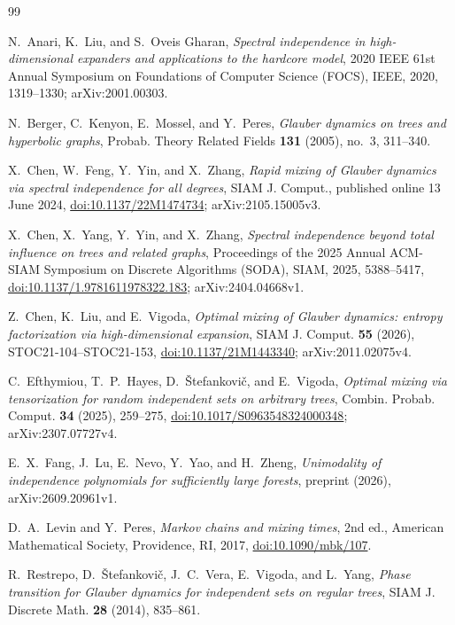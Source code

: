 \documentclass{amsart}
\numberwithin{equation}{section}
\numberwithin{table}{section}
\theoremstyle{definition}
\theoremstyle{remark}
\begin{document}
\begin{thebibliography}{99}

N.~Anari, K.~Liu, and S.~Oveis Gharan, \emph{Spectral independence in high-dimensional expanders and applications to the hardcore model}, 2020 IEEE 61st Annual Symposium on Foundations of Computer Science (FOCS), IEEE, 2020, 1319--1330; arXiv:2001.00303.

N.~Berger, C.~Kenyon, E.~Mossel, and Y.~Peres, \emph{Glauber dynamics on trees and hyperbolic graphs}, Probab. Theory Related Fields \textbf{131} (2005), no.~3, 311--340.

X.~Chen, W.~Feng, Y.~Yin, and X.~Zhang, \emph{Rapid mixing of Glauber dynamics via spectral independence for all degrees}, SIAM J. Comput., published online 13 June 2024, \href{https://doi.org/10.1137/22M1474734}{doi:10.1137/22M1474734}; arXiv:2105.15005v3.

X.~Chen, X.~Yang, Y.~Yin, and X.~Zhang, \emph{Spectral independence beyond total influence on trees and related graphs}, Proceedings of the 2025 Annual ACM-SIAM Symposium on Discrete Algorithms (SODA), SIAM, 2025, 5388--5417, \href{https://doi.org/10.1137/1.9781611978322.183}{doi:10.1137/1.9781611978322.183}; arXiv:2404.04668v1.

Z.~Chen, K.~Liu, and E.~Vigoda, \emph{Optimal mixing of Glauber dynamics: entropy factorization via high-dimensional expansion}, SIAM J. Comput. \textbf{55} (2026), STOC21-104--STOC21-153, \href{https://doi.org/10.1137/21M1443340}{doi:10.1137/21M1443340}; arXiv:2011.02075v4.

C.~Efthymiou, T.~P.~Hayes, D.~\v{S}tefankovi\v{c}, and E.~Vigoda, \emph{Optimal mixing via tensorization for random independent sets on arbitrary trees}, Combin. Probab. Comput. \textbf{34} (2025), 259--275, \href{https://doi.org/10.1017/S0963548324000348}{doi:10.1017/S0963548324000348}; arXiv:2307.07727v4.

E.~X.~Fang, J.~Lu, E.~Nevo, Y.~Yao, and H.~Zheng, \emph{Unimodality of independence polynomials for sufficiently large forests}, preprint (2026), arXiv:2609.20961v1.

D.~A.~Levin and Y.~Peres, \emph{Markov chains and mixing times}, 2nd ed., American Mathematical Society, Providence, RI, 2017, \href{https://doi.org/10.1090/mbk/107}{doi:10.1090/mbk/107}.

R.~Restrepo, D.~\v{S}tefankovi\v{c}, J.~C.~Vera, E.~Vigoda, and L.~Yang, \emph{Phase transition for Glauber dynamics for independent sets on regular trees}, SIAM J. Discrete Math. \textbf{28} (2014), 835--861.

\end{thebibliography}
\end{document}
